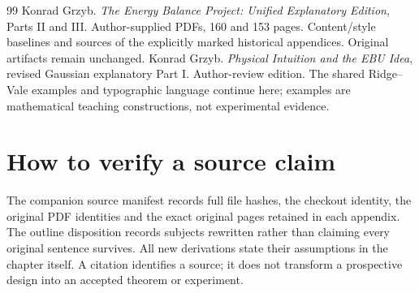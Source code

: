 \begin{thebibliography}{99}
 Konrad Grzyb. \emph{The Energy Balance Project: Unified Explanatory Edition}, Parts II and III. Author-supplied PDFs, 160 and 153 pages. Content/style baselines and sources of the explicitly marked historical appendices. Original artifacts remain unchanged.
 Konrad Grzyb. \emph{Physical Intuition and the EBU Idea}, revised Gaussian explanatory Part I. Author-review edition. The shared Ridge--Vale examples and typographic language continue here; examples are mathematical teaching constructions, not experimental evidence.
\end{thebibliography}
\section*{How to verify a source claim}
The companion source manifest records full file hashes, the checkout identity,
the original PDF identities and the exact original pages retained in each
appendix. The outline disposition records subjects rewritten rather than
claiming every original sentence survives. All new derivations state their
assumptions in the chapter itself. A citation identifies a source; it does
not transform a prospective design into an accepted theorem or experiment.
